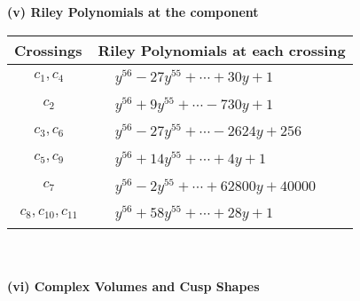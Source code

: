 \documentclass[1p]{elsarticle_modified}
\theoremstyle{definition}
\begin{document}
\newpage\renewcommand{\arraystretch}{1}
\flushleft \textbf{(v) Riley Polynomials at the component}\newline \\
\begin{tabular}{m{50pt}|m{274pt}}
Crossings & \hspace{64pt}Riley Polynomials at each crossing \\
\hline $$\begin{aligned}c_{1},c_{4}\end{aligned}$$&$\begin{aligned}
&y^{56}-27 y^{55}+\cdots+30 y+1
\end{aligned}$\\
\hline $$\begin{aligned}c_{2}\end{aligned}$$&$\begin{aligned}
&y^{56}+9 y^{55}+\cdots-730 y+1
\end{aligned}$\\
\hline $$\begin{aligned}c_{3},c_{6}\end{aligned}$$&$\begin{aligned}
&y^{56}-27 y^{55}+\cdots-2624 y+256
\end{aligned}$\\
\hline $$\begin{aligned}c_{5},c_{9}\end{aligned}$$&$\begin{aligned}
&y^{56}+14 y^{55}+\cdots+4 y+1
\end{aligned}$\\
\hline $$\begin{aligned}c_{7}\end{aligned}$$&$\begin{aligned}
&y^{56}-2 y^{55}+\cdots+62800 y+40000
\end{aligned}$\\
\hline $$\begin{aligned}c_{8},c_{10},c_{11}\end{aligned}$$&$\begin{aligned}
&y^{56}+58 y^{55}+\cdots+28 y+1
\end{aligned}$\\
\hline
\end{tabular}\\~\\
\newpage\flushleft \textbf{(vi) Complex Volumes and Cusp Shapes}
\end{document}

